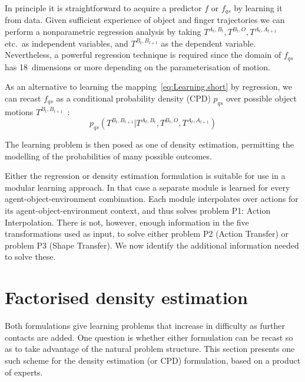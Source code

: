  In principle it is straightforward to acquire a predictor $f$ or
$f_{qs}$ by learning it from data. Given sufficient experience of
object and finger trajectories we can perform a nonparametric
regression analysis by taking $T^{A_t, B_t}, T^{B_t, O}, T^{A_{t},
  A_{t+1}}$ etc.\ as independent variables, and $T^{B_{t}, B_{t+1}}$
as the dependent variable.  Nevertheless, a powerful regression
technique is required since the domain of $f_{qs}$ has 18~dimensions
or more depending on the parameterisation of motion.

 As an alternative to learning the mapping~\eqref{eq:Learning.short} by regression, we can recast $f_{qs}$ as a conditional probability density (CPD) $p_{qs}$ over possible object motions $T^{B_{t},B_{t+1}}$~\cite{kopicki_prediction_2009}:
\begin{equation}
p_{qs}(T^{B_{t}, B_{t+1}} | T^{A_t, B_t}, T^{B_t, O}, T^{A_{t}, A_{t+1}})
\label{eq:Learning.density1}
\end{equation}

The learning problem is then posed as one of density estimation, permitting the modelling of the probabilities of many possible outcomes. 

Either the regression or density estimation formulation is suitable for use in a modular learning approach. In that case a separate module is learned for every agent-object-environment combination. Each module interpolates over actions for its agent-object-environment context, and thus solves problem P1: Action Interpolation. There is not, however, enough information in the five transformations used as input, to solve either problem P2 (Action Transfer) or problem P3 (Shape Transfer). We now identify the additional information needed to solve these.



\section{Factorised density estimation}
\label{sec:Factors}

Both formulations give learning problems that increase in difficulty as further contacts are added. One question is whether either formulation can be recast so as to take advantage of the natural
problem structure. This section presents one such scheme for the
density estimation (or CPD) formulation, based on a product of experts.

